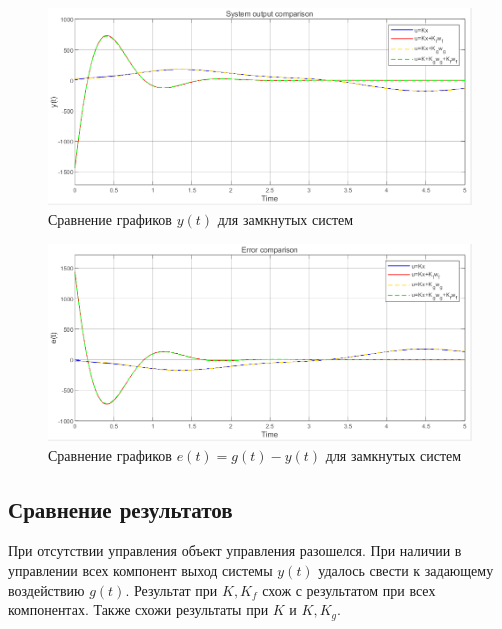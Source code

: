 \documentclass[a4paper, 12pt]{article}
\begin{document}
    \begin{figure}[H]
        \centering
        \includegraphics[scale=0.6]{1task_yy.png}
        \captionsetup{skip=0pt}
        \caption{Сравнение графиков $y(t)$ для замкнутых систем}
        \label{fig:1task_yy}
    \end{figure}
    \begin{figure}[H]
        \centering
        \includegraphics[scale=0.6]{1task_e.png}
        \captionsetup{skip=0pt}
        \caption{Сравнение графиков $e(t)=g(t)-y(t)$ для замкнутых систем}
        \label{fig:1task_e}
    \end{figure}


    \subsection{Сравнение результатов}
    При отсутствии управления объект управления разошелся.
    При наличии в управлении всех компонент выход системы $y(t)$
    удалось свести к задающему воздействию $g(t)$. Результат
    при $K,K_f$ схож с результатом при всех компонентах.
    Также схожи результаты при $K$ и $K,K_g$.
\end{document}
